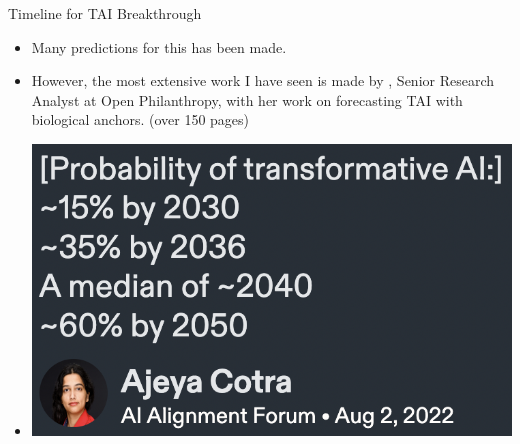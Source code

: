 \documentclass[10pt]{beamer}
\begin{document}
\begin{frame}{Timeline for TAI Breakthrough}
  \begin{itemize}[<+- | alert@+>]
  \item Many predictions for this has been made. 
  \item However, the most extensive work I have seen is made by \citet{Ajeya}, Senior Research Analyst at Open Philanthropy, with her work on forecasting TAI with biological anchors. (over 150 pages) 
  \item \includegraphics[scale=0.2]{images/prediction.png}
  \end{itemize}

\end{frame}
\end{document}
